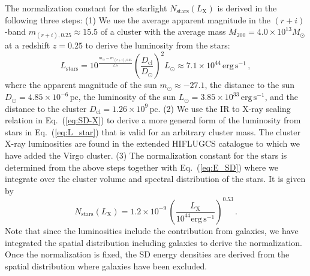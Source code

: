 \documentclass[10pt,aps,pra,reprint,amsmath,amsfonts,amssymb,showpacs]{revtex4-1}
\newcommand{\rmn}{\mathrm}
\newcommand{\clu}{\rmn{cl}}
\newcommand{\msun}{M_\odot}
\newcommand{\stars}{\rmn{stars}}
\newcommand{\lx}{L_\rmn{X}}
\newcommand{\mvir}{M_{200}}
\begin{document}
The normalization constant for the starlight $N_\stars(\lx)$ is derived
in the following three steps: (1) We use the average apparent magnitude
in the $(r+i)$-band $m_{(r+i),0.25}\approx 15.5$
\cite{2005MNRAS.358..949Z} of a cluster with the average mass
$\mvir=4.0\times10^{13}\msun$ at a redshift $z=0.25$ to derive the
luminosity from the stars:
\begin{equation}
L_\stars=10^{\frac{m_\odot-m_{(r+i),0.25}}{2.5}}
\left(\frac{D_\clu}{D_\odot}\right)^2 L_\odot
\approx 7.1\times10^{44}\,\rmn{erg}\,\rmn{s}^{-1}\,,
\label{eq:L_star}
\end{equation}
where the apparent magnitude of the sun $m_\odot\approx -27.1$, the
distance to the sun $D_\odot=4.85\times10^{-6}\,\rmn{pc}$, the
luminosity of the sun $L_\odot=3.85\times10^{33}\,\rmn{erg\,s}^{-1}$,
and the distance to the cluster $D_\clu=1.26\times10^9\,\rmn{pc}$. (2)
We use the IR to X-ray scaling relation in Eq.~(\ref{eq:SD-X}) to derive
a more general form of the luminosity from stars in
Eq.~(\ref{eq:L_star}) that is valid for an arbitrary cluster mass. The
cluster X-ray luminosities are found in the extended HIFLUGCS
catalogue \cite{2002ApJ...567..716R} to which we have added the Virgo
cluster. (3) The normalization constant for the stars is
determined from the above steps together with Eq.~(\ref{eq:E_SD})
where we integrate over the cluster volume and spectral distribution
of the stars. It is given by
\begin{equation}
 N_\stars(\lx) = 1.2\times10^{-9}\,
\left(\frac{\lx}{10^{44}\rmn{erg\,s}^{-1}}\right)^{0.53}\,.
\label{eq:N_stars}
\end{equation}
Note that since the luminosities include the contribution from
galaxies, we have integrated the spatial distribution including
galaxies to derive the normalization. Once the normalization is fixed,
the SD energy densities are derived from the spatial distribution
where galaxies have been excluded.
\end{document}
